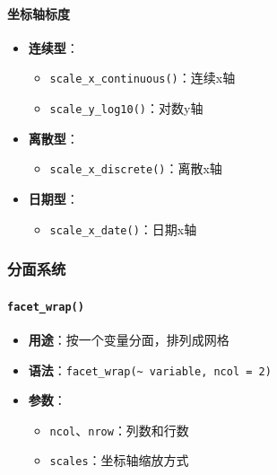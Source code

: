 \documentclass[
]{book}
\providecommand{\tightlist}{%
  \setlength{\itemsep}{0pt}\setlength{\parskip}{0pt}}
\begin{document}
\hypertarget{ux5750ux6807ux8f74ux6807ux5ea6}{%
\paragraph{坐标轴标度}\label{ux5750ux6807ux8f74ux6807ux5ea6}}

\begin{itemize}
\tightlist
\item
  \textbf{连续型}：

  \begin{itemize}
  \tightlist
  \item
    \texttt{scale\_x\_continuous()}：连续x轴
  \item
    \texttt{scale\_y\_log10()}：对数y轴
  \end{itemize}
\item
  \textbf{离散型}：

  \begin{itemize}
  \tightlist
  \item
    \texttt{scale\_x\_discrete()}：离散x轴
  \end{itemize}
\item
  \textbf{日期型}：

  \begin{itemize}
  \tightlist
  \item
    \texttt{scale\_x\_date()}：日期x轴
  \end{itemize}
\end{itemize}

\hypertarget{ux5206ux9762ux7cfbux7edf}{%
\subsubsection{分面系统}\label{ux5206ux9762ux7cfbux7edf}}

\hypertarget{facet_wrap}{%
\paragraph{\texorpdfstring{\texttt{facet\_wrap()}}{facet\_wrap()}}\label{facet_wrap}}

\begin{itemize}
\tightlist
\item
  \textbf{用途}：按一个变量分面，排列成网格
\item
  \textbf{语法}：\texttt{facet\_wrap(\textasciitilde{}\ variable,\ ncol\ =\ 2)}
\item
  \textbf{参数}：

  \begin{itemize}
  \tightlist
  \item
    \texttt{ncol}、\texttt{nrow}：列数和行数
  \item
    \texttt{scales}：坐标轴缩放方式
  \end{itemize}
\end{itemize}
\end{document}
